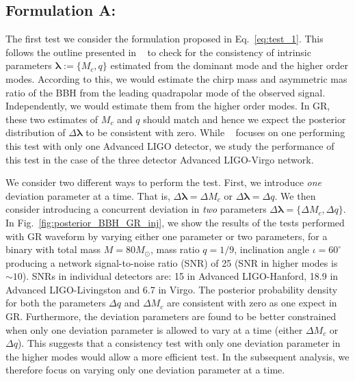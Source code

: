 \documentclass[prd,preprintnumbers,twocolumn,eqsecnum,floatfix,a4paper,nofootinbib,superscriptaddress]{revtex4}
\newcommand{\blambda}{\bm{\lambda}}
\begin{document}
\subsection{Formulation A:}
\label{sec:formulationA}
The first test we consider the formulation proposed in Eq.~\eqref{eq:test_1}. This follows the outline presented in ~\cite{dhanpal2018} to check for the consistency of intrinsic parameters $\blambda := \{M_c, q\}$ estimated from the dominant mode and the higher order modes. According to this, we would estimate the chirp mass and asymmetric mas ratio of the BBH from the leading quadrapolar mode of the observed signal. Independently, we would estimate them from the higher order modes. In GR, these two estimates of $M_c$ and $q$ should match and hence we expect the posterior distribution of $\Delta \blambda $ to be consistent with zero. While ~\cite{dhanpal2018} focuses on one performing this test with only one Advanced LIGO detector, we study the performance of this test in the case of the three detector Advanced LIGO-Virgo network. 

We consider two different ways to perform the test. First, we introduce \emph{one} deviation parameter at a time. That is, $\Delta\blambda = {\Delta M_c}$ or $\Delta\blambda = {\Delta q}$. We then consider introducing a concurrent deviation in \emph{two} parameters $\Delta \blambda = \{\Delta M_c, \Delta q\}$. In Fig.~\ref{fig:posterior_BBH_GR_inj}, we show the results of the tests performed with GR waveform by varying either one parameter or two parameters, for a binary with total mass $M = 80M_{\odot}$, mass ratio $q=1/9$, inclination angle $ {\iota}=60^{\circ} $ producing a network signal-to-noise ratio  (SNR)  of 25 (SNR in higher modes is $\sim 10$). SNRs in individual detectors are: 15 in Advanced LIGO-Hanford, 18.9 in Advanced LIGO-Livingston and 6.7 in Virgo. The posterior probability density for both the parameters $\Delta q$ and $\Delta M_c$ are consistent with zero as one expect in GR. Furthermore, the deviation parameters are found to be better constrained when only one deviation parameter is allowed to vary at a time (either $\Delta M_c$ or $\Delta q$). This suggests that a consistency test with only one deviation parameter in the higher modes would allow a more efficient test. In the subsequent analysis, we therefore focus on varying only one deviation parameter at a time. 
\end{document}
